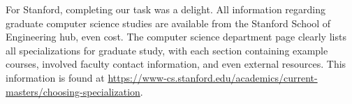 For Stanford, completing our task was a delight. All information regarding
graduate computer science studies are available from the Stanford School of
Engineering hub, even cost. The computer science department page clearly lists
all specializations for graduate study, with each section containing example
courses, involved faculty contact information, and even external resources. This
information is found at
\url{https://www-cs.stanford.edu/academics/current-masters/choosing-specialization}.


